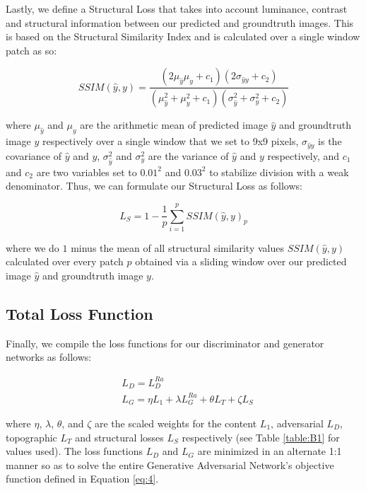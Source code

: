 \documentclass[tc, manuscript]{copernicus}
\begin{document}
Lastly, we define a Structural Loss that takes into account luminance, contrast and structural information between our predicted and groundtruth images.
This is based on the Structural Similarity Index \citep[SSIM,][]{WangImageQualityAssessment2004} and is calculated over a single window patch as so:

\begin{equation}\label{eq:A6}
  SSIM(\hat{y}, y) = \dfrac{(2\mu_{\hat{y}}\mu_y + c_1)(2\sigma_{{\hat{y}}y} + c_2)}{(\mu_{\hat{y}}^2 + \mu_y^2 + c_1)(\sigma_{\hat{y}}^2 + \sigma_y^2 + c_2)}
\end{equation}

where $\mu_{\hat{y}}$ and $\mu_y$ are the arithmetic mean of predicted image ${\hat{y}}$ and groundtruth image $y$ respectively over a single window that we set to 9x9 pixels, $\sigma_{{\hat{y}}y}$ is the covariance of ${\hat{y}}$ and $y$, $\sigma_{\hat{y}}^2$ and $\sigma_y^2$ are the variance of ${\hat{y}}$ and $y$ respectively, and $c_1$ and $c_2$ are two variables set to $0.01^2$ and $0.03^2$ to stabilize division with a weak denominator.
Thus, we can formulate our Structural Loss as follows:

\begin{equation}\label{eq:A7}
  L_S = 1 - \dfrac{1}{p} \sum\limits_{i=1}^p SSIM(\hat{y}, y)_p
\end{equation}

where we do $1$ minus the mean of all structural similarity values $SSIM(\hat{y}, y)$ calculated over every patch $p$ obtained via a sliding window over our predicted image ${\hat{y}}$ and groundtruth image $y$.

\subsection{Total Loss Function}

Finally, we compile the loss functions for our discriminator and generator networks as follows:

\begin{align}
  & L_D = L_D^{Ra} \label{eq:A8}\\
  & L_G = \eta L_1 + \lambda L_G^{Ra} + \theta L_T + \zeta L_S \label{eq:A9}
\end{align}

where $\eta$, $\lambda$, $\theta$, and $\zeta$ are the scaled weights for the content $L_1$, adversarial $L_D$, topographic $L_T$ and structural losses $L_S$ respectively (see Table \ref{table:B1} for values used).
The loss functions $L_D$ and $L_G$ are minimized in an alternate 1:1 manner so as to solve the entire Generative Adversarial Network's objective function defined in Equation \eqref{eq:4}.
\end{document}
